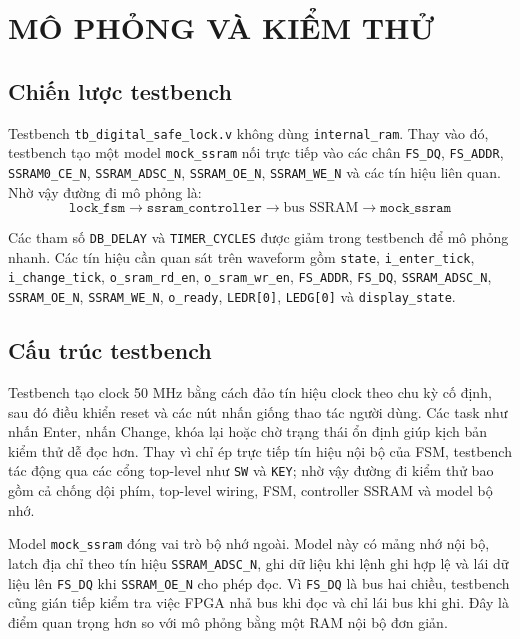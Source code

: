 \documentclass[13pt,a4paper]{article}
\begin{document}
\clearpage
\section{MÔ PHỎNG VÀ KIỂM THỬ}
\subsection{Chiến lược testbench}
Testbench \texttt{tb\_digital\_safe\_lock.v} không dùng \texttt{internal\_ram}. Thay vào đó, testbench tạo một model \texttt{mock\_ssram} nối trực tiếp vào các chân \texttt{FS\_DQ}, \texttt{FS\_ADDR}, \texttt{SSRAM0\_CE\_N}, \texttt{SSRAM\_ADSC\_N}, \texttt{SSRAM\_OE\_N}, \texttt{SSRAM\_WE\_N} và các tín hiệu liên quan. Nhờ vậy đường đi mô phỏng là:
\[
\texttt{lock\_fsm} \rightarrow \texttt{ssram\_controller} \rightarrow \text{bus SSRAM} \rightarrow \texttt{mock\_ssram}
\]

Các tham số \texttt{DB\_DELAY} và \texttt{TIMER\_CYCLES} được giảm trong testbench để mô phỏng nhanh. Các tín hiệu cần quan sát trên waveform gồm \texttt{state}, \texttt{i\_enter\_tick}, \texttt{i\_change\_tick}, \texttt{o\_sram\_rd\_en}, \texttt{o\_sram\_wr\_en}, \texttt{FS\_ADDR}, \texttt{FS\_DQ}, \texttt{SSRAM\_ADSC\_N}, \texttt{SSRAM\_OE\_N}, \texttt{SSRAM\_WE\_N}, \texttt{o\_ready}, \texttt{LEDR[0]}, \texttt{LEDG[0]} và \texttt{display\_state}.

\subsection{Cấu trúc testbench}
Testbench tạo clock 50 MHz bằng cách đảo tín hiệu clock theo chu kỳ cố định, sau đó điều khiển reset và các nút nhấn giống thao tác người dùng. Các task như nhấn Enter, nhấn Change, khóa lại hoặc chờ trạng thái ổn định giúp kịch bản kiểm thử dễ đọc hơn. Thay vì chỉ ép trực tiếp tín hiệu nội bộ của FSM, testbench tác động qua các cổng top-level như \texttt{SW} và \texttt{KEY}; nhờ vậy đường đi kiểm thử bao gồm cả chống dội phím, top-level wiring, FSM, controller SSRAM và model bộ nhớ.

Model \texttt{mock\_ssram} đóng vai trò bộ nhớ ngoài. Model này có mảng nhớ nội bộ, latch địa chỉ theo tín hiệu \texttt{SSRAM\_ADSC\_N}, ghi dữ liệu khi lệnh ghi hợp lệ và lái dữ liệu lên \texttt{FS\_DQ} khi \texttt{SSRAM\_OE\_N} cho phép đọc. Vì \texttt{FS\_DQ} là bus hai chiều, testbench cũng gián tiếp kiểm tra việc FPGA nhả bus khi đọc và chỉ lái bus khi ghi. Đây là điểm quan trọng hơn so với mô phỏng bằng một RAM nội bộ đơn giản.
\end{document}
